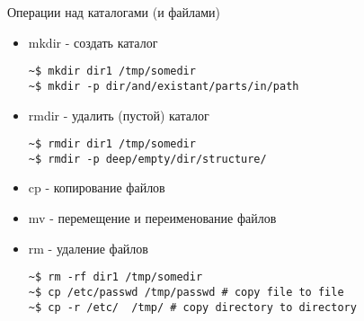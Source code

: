 \begin{frame}[fragile]{Операции над каталогами (и файлами)}
  \begin{itemize}
    \item \alert{mkdir} - создать каталог
\begin{lstlisting}
~$ mkdir dir1 /tmp/somedir
~$ mkdir -p dir/and/existant/parts/in/path
\end{lstlisting} \pause
    \item \alert{rmdir} - удалить (пустой) каталог
\begin{lstlisting}
~$ rmdir dir1 /tmp/somedir
~$ rmdir -p deep/empty/dir/structure/
\end{lstlisting} \pause
    \item \alert{cp} - копирование файлов\footnotemark[8]
    \item \alert{mv} - перемещение и переименование файлов
    \item \alert{rm} - удаление файлов\footnotemark[17]
\begin{lstlisting}
~$ rm -rf dir1 /tmp/somedir
~$ cp /etc/passwd /tmp/passwd # copy file to file 
~$ cp -r /etc/  /tmp/ # copy directory to directory
\end{lstlisting} \pause
  \end{itemize}
\end{frame}
